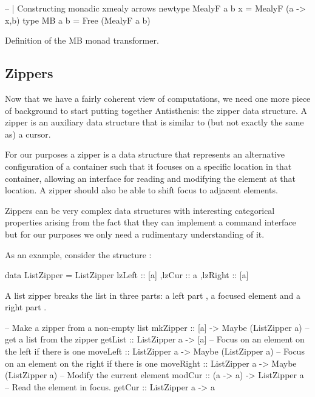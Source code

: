 \begin{code}
\begin{haskellcode}
-- | Constructing monadic xmealy arrows
newtype MealyF a b x = MealyF (a -> x,b)
type MB a b = Free (MealyF a b)
\end{haskellcode}
  \caption{\label{lst:mb_def}Definition of the MB monad transformer.}
\end{code}


\subsection{Zippers}

Now that we have a fairly coherent view of computations, we need one
more piece of background to start putting together Antisthenis: the
zipper data structure. A zipper \cite{huetZipper1997} is an auxiliary
data structure that is similar to (but not exactly the same as) a
cursor.

For our purposes a zipper is a data structure that represents an
alternative configuration of a container such that it focuses on a
specific location in that container, allowing an interface for reading
and modifying the element at that location. A zipper should also be
able to shift focus to adjacent elements.

Zippers can be very complex data structures with interesting
categorical properties arising from the fact that they can implement a
command interface \cite{uustaluComonadicFunctionalAttribute2005} but
for our purposes we only need a rudimentary understanding of it.

As an example, consider the structure :

\begin{haskellcode}
data ListZipper =
  ListZipper
  { lzLeft :: [a]
   ,lzCur :: a
   ,lzRight :: [a]
  }
\end{haskellcode}

A list zipper breaks the list in three parts: a left part , a
focused element  and a right part .

\begin{haskellcode}
-- Make a zipper from a non-empty list
mkZipper :: [a] -> Maybe (ListZipper a)
-- get a list from the zipper
getList :: ListZipper a -> [a]
-- Focus on an element on the left if there is one
moveLeft :: ListZipper a -> Maybe (ListZipper a)
-- Focus on an element on the right if there is one
moveRight :: ListZipper a -> Maybe (ListZipper a)
-- Modify the current element
modCur :: (a -> a) -> ListZipper a
-- Read the element in focus.
getCur :: ListZipper a -> a
\end{haskellcode}


